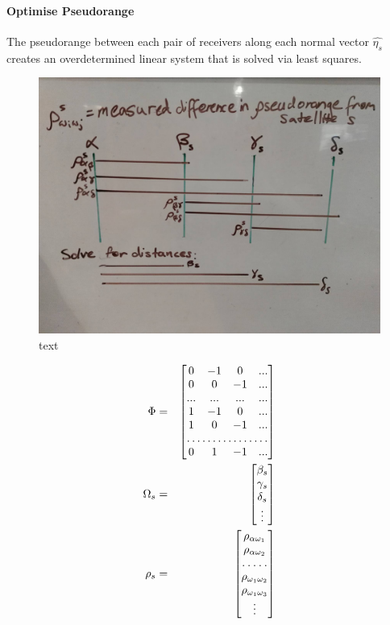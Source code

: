 \documentclass[11pt,a4paper]{article}
\begin{document}
\paragraph{Optimise Pseudorange}
The pseudorange between each pair of receivers along each normal vector $\hat{\eta_s}$ creates an overdetermined linear system that is solved via least squares. 
\begin{figure}
\centering
\caption{text}
\label{key}
\includegraphics[width=0.7\linewidth]{solve_distances.jpg}
\end{figure}
\begin{eqnarray}
\Phi &=& \begin{bmatrix}
0 & -1 & 0 & ...\\
0 & 0 & -1 & ...\\
... & ... & ... & ... \\
1 & -1 & 0 & ...\\
1 & 0 & -1 & ...\\
\hdotsfor{4} \\
0 & 1 & -1 & ...
\end{bmatrix} \\
%
\Omega_s &=& \begin{bmatrix}
\beta_s \\
\gamma_s\\
\delta_s \\
\vdots
\end{bmatrix} \\
%
\rho_s &=& \begin{bmatrix}
\rho_{\alpha\omega_1}\\
\rho_{\alpha\omega_2}\\
\hdotsfor{1}\\
\rho_{\omega_1\omega_2}\\
\rho_{\omega_1\omega_3}\\
\vdots
\end{bmatrix} 
\end{eqnarray}
\end{document}
